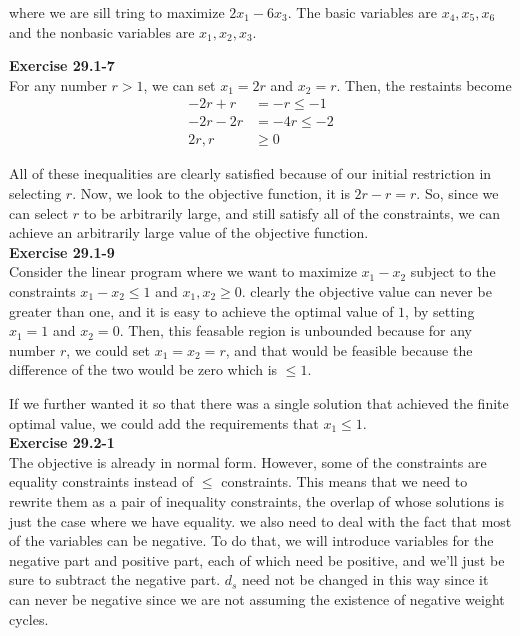 \documentclass{article}
\begin{document}
where we are sill tring to maximize $2x_1 -6x_3$. The basic variables are $x_4,x_5,x_6$ and the nonbasic variables are $x_1,x_2,x_3$.


\noindent\textbf{Exercise 29.1-7}\\
For any number $r>1$, we can set $x_1 = 2r$ and $x_2 = r$. Then, the restaints become
\begin{align*}
-2r +r &= -r \le -1\\
-2r -2r &=-4r \le -2\\
2r,r &\ge 0
\end{align*}

All of these inequalities are clearly satisfied because of our initial restriction in selecting $r$. Now, we look to the objective function, it is $2r -r = r$. So, since we can select $r$ to be arbitrarily large, and still satisfy all of the constraints, we can achieve an arbitrarily large value of the objective function.\\

\noindent\textbf{Exercise 29.1-9}\\
Consider the linear program where we want to maximize $x_1-x_2$ subject to the constraints $x_1-x_2 \le 1$ and $x_1,x_2\ge 0$. clearly the objective value can never be greater than one, and it is easy to achieve the optimal value of $1$, by setting $x_1 = 1$ and $x_2 = 0$. Then, this feasable region is unbounded because for any number $r$, we could set $x_1 = x_2 =r$, and that would be feasible because the difference of the two would be zero which is $\le 1$.

If we further wanted it so that there was a single solution that achieved the finite optimal value, we could add the requirements that $x_1 \le 1$.\\

\noindent\textbf{Exercise 29.2-1}\\
The objective is already in normal form. However, some of the constraints are equality constraints instead of $\le$ constraints. This means that we need to rewrite them as a pair of inequality constraints, the overlap of whose solutions is just the case where we have equality. we also need to deal with the fact that most of the variables can be negative. To do that, we will introduce variables for the negative part and positive part, each of which need be positive, and we'll just be sure to subtract the negative part. $d_s$ need not be changed in this way since it can never be negative since we are not assuming the existence of negative weight cycles.
\end{document}
